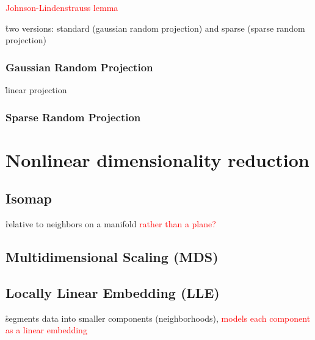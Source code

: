 \textcolor{red}{Johnson-Lindenstrauss lemma}

\r{two versions: standard (gaussian random projection) and sparse (sparse random projection)}

\subsubsection{Gaussian Random Projection}

\r{linear projection}

\subsubsection{Sparse Random Projection}


\section{Nonlinear dimensionality reduction}


\subsection{Isomap}


\r{relative to neighbors on a manifold \textcolor{red}{rather than a plane?}}

\subsection{Multidimensional Scaling (MDS)}


\subsection{Locally Linear Embedding (LLE)}

\r{segments data into smaller components (neighborhoods), \textcolor{red}{models each component as a linear embedding}}

